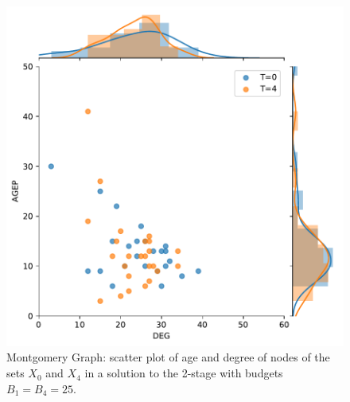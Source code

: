 \begin{figure}[!h]
    \centering
    \includegraphics[scale = 0.45]{figures/t0_t4_compare_age_deg.pdf}
    \caption{Montgomery Graph: scatter plot of age and degree of nodes of the sets $X_0$ and $X_4$ in a solution to the 2-stage \prob{} with budgets $B_1 = B_4 = 25$.}
    \label{fig:montagedeg}
\end{figure}

\



